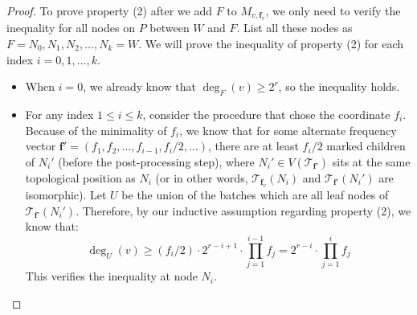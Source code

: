 \documentclass[11pt,a4paper]{article}
\newcommand{\tree}{\mathcal{T}}
\newcommand{\freq}{\mathbf{f}}
\begin{document}
\begin{proof}
	To prove property (2) after we add $F$ to $M_{v, \freq_v}$, we only need to verify the inequality for all nodes on $P$ between $W$ and $F$. List all these nodes as $F = N_0, N_1, N_2, \ldots, N_k = W$. We will prove the inequality of property (2) for each index $i = 0, 1, \ldots, k$.
	\begin{itemize}
		\item When $i = 0$, we already know that $\deg_F(v)\geq 2^r$, so the inequality holds.
		\item For any index $1\leq i\leq k$, consider the procedure that chose the coordinate $f_i$. Because of the minimality of $f_i$, we know that for some alternate frequency vector $\freq' = (f_1, f_2, \ldots, f_{i-1}, f_i / 2, \ldots)$, there are at least $f_i/2$ marked children of $N_i'$ (before the post-processing step), where $N_i'\in V(\tree_{\freq'})$ sits at the same topological position as $N_i$ (or in other words, $\tree_{\freq_v}(N_i)$ and $\tree_{\freq'}(N_i')$ are isomorphic). Let $U$ be the union of the batches which are all leaf nodes of $\tree_{\freq'}(N_i')$. Therefore, by our inductive assumption regarding property (2), we know that: 
		$$\deg_U(v)\geq  (f_i / 2)\cdot 2^{r - i+1}\cdot \prod_{j=1}^{i-1}f_j = 2^{r - i}\cdot \prod_{j=1}^{i}f_j$$
		This verifies the inequality at node $N_i$.\qedhere
	\end{itemize}
\end{proof}
\end{document}
